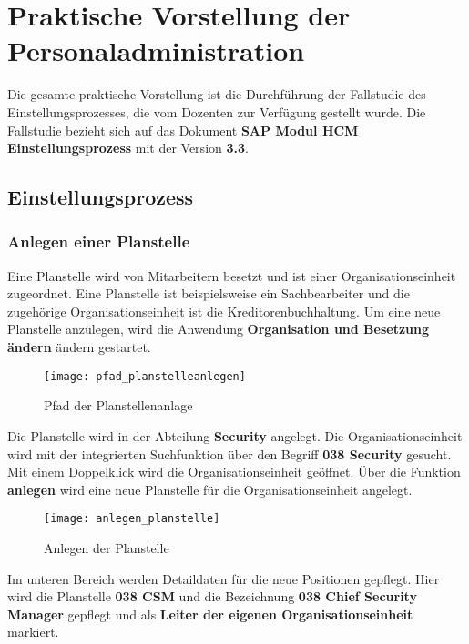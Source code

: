 

\section{Praktische Vorstellung der Personaladministration}
\label{sec:praktischevorstellungderpersonaladministration}

Die gesamte praktische Vorstellung ist die Durchführung der Fallstudie des Einstellungsprozesses, die vom Dozenten zur Verfügung gestellt wurde. Die Fallstudie bezieht sich auf das Dokument \textbf{SAP Modul HCM Einstellungsprozess} mit der Version \textbf{3.3}.

\subsection{Einstellungsprozess}
\subsubsection{Anlegen einer Planstelle}
Eine Planstelle wird von Mitarbeitern besetzt und ist einer Organisationseinheit zugeordnet. Eine Planstelle ist beispielsweise ein Sachbearbeiter und die zugehörige Organisationseinheit ist die Kreditorenbuchhaltung. Um eine neue Planstelle anzulegen, wird die Anwendung \textbf{Organisation und Besetzung ändern} ändern gestartet.

\begin{figure}[H]
	\centering
	\texttt{[image: pfad\_planstelleanlegen]}
	\caption{Pfad der Planstellenanlage}
	\label{fig:pfad_planstelleanlegen}
\end{figure}

Die Planstelle wird in der Abteilung \textbf{Security} angelegt. Die Organisationseinheit wird mit der integrierten Suchfunktion über den Begriff \textbf{038 Security} gesucht. Mit einem Doppelklick wird die Organisationseinheit geöffnet. Über die Funktion \textbf{anlegen} wird eine neue Planstelle für die Organisationseinheit angelegt.

\begin{figure}[H]
	\centering
	\texttt{[image: anlegen\_planstelle]}
	\caption{Anlegen der Planstelle}
	\label{fig:anlegen_planstelle}
\end{figure}

Im unteren Bereich werden Detaildaten für die neue Positionen gepflegt. Hier wird die Planstelle \textbf{038 CSM} und die Bezeichnung \textbf{038 Chief Security Manager} gepflegt und als \textbf{Leiter der eigenen Organisationseinheit} markiert.

